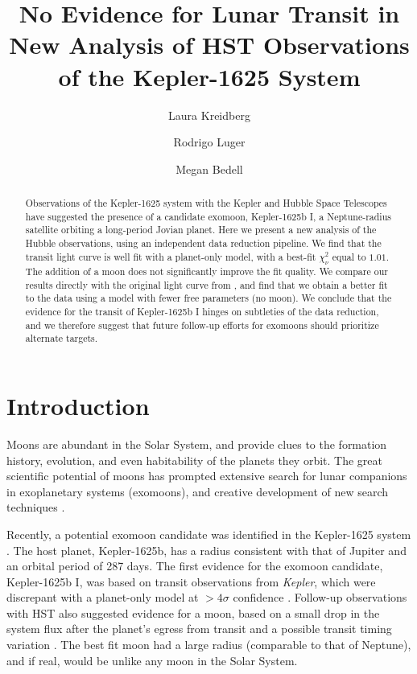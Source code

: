 \documentclass[twocolumn]{aastex62}
\newcommand{\project}[1]{\textsl{#1}}
\newcommand{\Kepler}{\project{Kepler}}
\begin{document}
\title{No Evidence for Lunar Transit in New Analysis of HST Observations of the Kepler-1625 System}

\author{Laura Kreidberg}
\author{Rodrigo Luger}
\author{Megan Bedell}

\begin{abstract}
    Observations of the Kepler-1625 system with the Kepler and Hubble Space Telescopes have suggested the presence of a candidate exomoon, Kepler-1625b I, a Neptune-radius satellite orbiting a long-period Jovian planet. Here we present a new analysis of the Hubble observations, using an independent data reduction pipeline. We find that the transit light curve is well fit with a planet-only model, with a best-fit $\chi^2_\nu$ equal to $1.01$. The addition of a moon does not significantly improve the fit quality. We compare our results directly with the original light curve from \cite{teachey18b}, and find that we obtain a better fit to the data using a model with fewer free parameters (no moon). We conclude that the evidence for the transit of Kepler-1625b I hinges on subtleties of the data reduction, and we therefore suggest that future follow-up efforts for exomoons should prioritize alternate targets.

\end{abstract}


\section{Introduction} \label{sec:intro}
Moons are abundant in the Solar System, and provide clues to the formation history, evolution, and even habitability of the planets they orbit. The great scientific potential of moons has prompted extensive search for lunar companions in exoplanetary systems (exomoons), and creative development of new search techniques \citep[e.g.][]{kipping09a, kipping09b, kipping13, simon10, peters13, heller14, noyola14, hippke15, agol15, sengupta16,  vanderburg18}. 

Recently, a potential exomoon candidate was identified in the Kepler-1625 system \citep{teachey18a}. The host planet, Kepler-1625b, has a radius consistent with that of Jupiter and an orbital period of 287 days.  The first evidence for the exomoon candidate, Kepler-1625b I, was based on transit observations from \Kepler, which were discrepant with a planet-only model at $>4\sigma$ confidence \citep{teachey18a}. Follow-up observations with HST also suggested evidence for a moon, based on a small drop in the system flux after the planet's egress from transit and a possible transit timing variation \citep[][ hereafter TK18]{teachey18b}. The best fit moon had a large radius (comparable to that of Neptune), and if real, would be unlike any moon in the Solar System.
\end{document}
